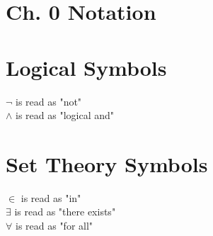 \documentclass[11pt]{article}
\begin{document}
\section*{Ch. 0 Notation}



\section{Logical Symbols}
$\lnot$ is read as "not"\\
$\land$ is read as "logical and"



\section{Set Theory Symbols}
$\in$ is read as "in"\\
$\exists$ is read as "there exists"\\
$\forall$ is read as "for all"
\end{document}

